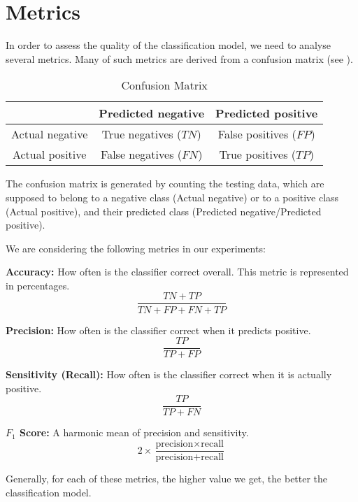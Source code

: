 \section{Metrics}
In order to assess the quality of the classification model, we need to analyse several metrics. Many of such metrics are derived from a confusion matrix (see ).
\begin{table}[ht]
    \centering
    \begin{tabular}{|c|c|c|}
        \hline
        & Predicted negative & Predicted positive \\ 
        \hline 
        Actual negative & True negatives ($TN$) & False positives ($FP$) \\ 
        \hline
        Actual positive & False negatives ($FN$) & True positives ($TP$)  \\ 
        \hline
    \end{tabular}
    \caption{Confusion Matrix}
    \label{tab:confusion_matrix}
\end{table}
The confusion matrix is generated by counting the testing data, which are supposed to belong to a negative class (Actual negative) or to a positive class (Actual positive), and their predicted class (Predicted negative/Predicted positive).

We are considering the following metrics in our experiments:
\begin{description}
    \item{\textbf{Accuracy:}} How often is the classifier correct overall. This metric is represented in percentages.
    \begin{equation}
        \frac{TN+TP}{TN+FP+FN+TP}
        \label{eq:svm:accuracy}
    \end{equation}
    \item{\textbf{Precision:}} How often is the classifier correct when it predicts positive.
    \begin{equation}
        \frac{TP}{TP+FP}
        \label{eq:svm:precision}
    \end{equation}
    \item{\textbf{Sensitivity (Recall):}} How often is the classifier correct when it is actually positive.
    \begin{equation}
        \frac{TP}{TP+FN}
        \label{eq:svm:sensitivity}
    \end{equation}
    \item{\textbf{\( F_1 \) Score:}} A harmonic mean of precision and sensitivity.
    \begin{equation}
        2\times\frac{\text{precision}\times\text{recall}}{\text{precision}+\text{recall}}
        \label{eq:svm:F1}
    \end{equation}
\end{description}

Generally, for each of these metrics, the higher value we get, the better the classification model.
